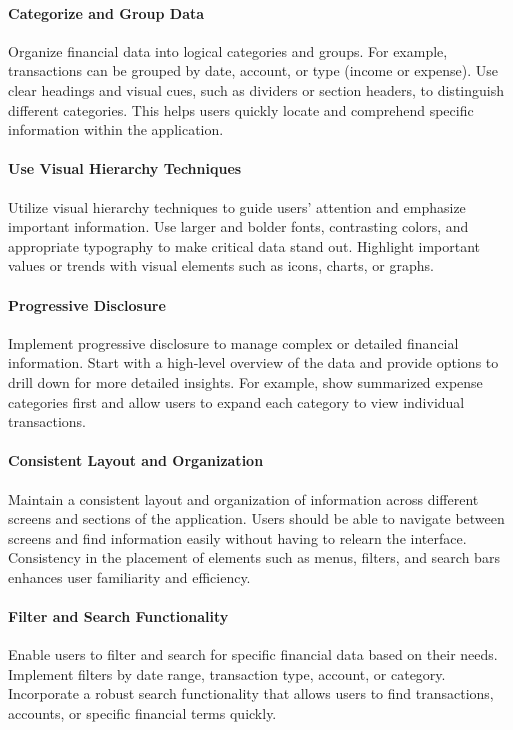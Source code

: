 \paragraph{Categorize and Group Data}
Organize financial data into logical categories and groups. For example, transactions can 
be grouped by date, account, or type (income or expense). Use clear headings and visual cues, such as dividers or 
section headers, to distinguish different categories. This helps users quickly locate and comprehend specific 
information within the application.

\paragraph{Use Visual Hierarchy Techniques}
Utilize visual hierarchy techniques to guide users' attention and emphasize important 
information. Use larger and bolder fonts, contrasting colors, and appropriate typography to make critical data 
stand out. Highlight important values or trends with visual elements such as icons, charts, or graphs.

\paragraph{Progressive Disclosure}
Implement progressive disclosure to manage complex or detailed financial information. Start 
with a high-level overview of the data and provide options to drill down for more detailed insights. For example, 
show summarized expense categories first and allow users to expand each category to view individual transactions.

\paragraph{Consistent Layout and Organization}
Maintain a consistent layout and organization of information across different 
screens and sections of the application. Users should be able to navigate between screens and find information easily 
without having to relearn the interface. Consistency in the placement of elements such as menus, filters, and search 
bars enhances user familiarity and efficiency.

\paragraph{Filter and Search Functionality}
Enable users to filter and search for specific financial data based on their needs. 
Implement filters by date range, transaction type, account, or category. Incorporate a robust search functionality 
that allows users to find transactions, accounts, or specific financial terms quickly.

